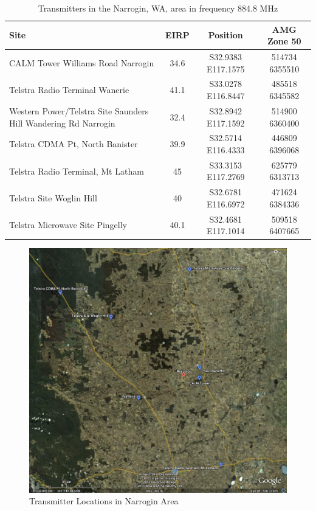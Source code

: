 \documentclass[a4paper]{report}
\numberwithin{equation}{chapter}
\begin{document}
\begin{table}
\begin{center}
\begin{tabular}{|p{5cm}|c|c|c|}
\hline
Site & EIRP & Position & AMG Zone 50 \\ \hline \hline
CALM Tower Williams Road Narrogin & 34.6 & S32.9383 E117.1575 & 514734 6355510 \\ \hline
Telstra Radio Terminal Wanerie & 41.1 & S33.0278 E116.8447 & 485518 6345582 \\ \hline
Western Power/Telstra Site Saunders Hill Wandering Rd Narrogin & 32.4 & S32.8942 E117.1592 & 514900 6360400 \\ \hline
Telstra CDMA Pt, North Banister & 39.9 & S32.5714 E116.4333 & 446809 6396068 \\ \hline
Telstra Radio Terminal, Mt Latham & 45 & S33.3153 E117.2769 & 625779 6313713 \\ \hline
Telstra Site Woglin Hill & 40 & S32.6781 E116.6972 & 471624 6384336 \\ \hline
Telstra Microwave Site Pingelly & 40.1 & S32.4681 E117.1014 & 509518 6407665 \\ \hline
\end{tabular}
\caption{Transmitters in the Narrogin, WA, area in frequency 884.8 MHz}
\label{tab:02}
\end{center}
\end{table}

\begin{figure}
\centering 
\includegraphics[scale=0.35]{Narrogin-Transmitter-Locations.jpg}
\caption[Transmitter Locations in Narrogin Area]{Transmitter Locations in Narrogin Area}
\label{fig:xmitter-Narrogin}
\end{figure}
\end{document}
